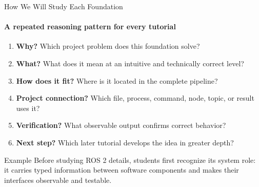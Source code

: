 \begin{frame}{How We Will Study Each Foundation}
    \framesubtitle{A repeated reasoning pattern for every tutorial}
    \footnotesize
    \begin{enumerate}
        \setlength{\itemsep}{0.35em}
        \item \textbf{Why?} Which project problem does this foundation solve?
        \item \textbf{What?} What does it mean at an intuitive and technically correct level?
        \item \textbf{How does it fit?} Where is it located in the complete pipeline?
        \item \textbf{Project connection?} Which file, process, command, node, topic, or result uses it?
        \item \textbf{Verification?} What observable output confirms correct behavior?
        \item \textbf{Next step?} Which later tutorial develops the idea in greater depth?
    \end{enumerate}
    \begin{exampleblock}{Example}
        Before studying ROS 2 details, students first recognize its system role: it carries typed information between software components and makes their interfaces observable and testable.
    \end{exampleblock}
\end{frame}

